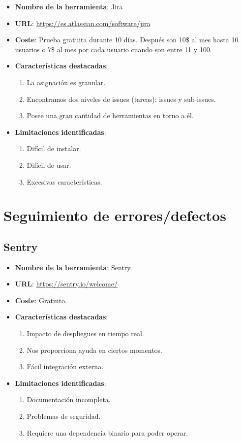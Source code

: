 \begin{itemize}
	\item \textbf{Nombre de la herramienta}: Jira
	\item \textbf{URL}: \url{https://es.atlassian.com/software/jira}
	\item \textbf{Coste}: Prueba gratuita durante 10 días. Después son 10\$ al mes hasta 10 usuarios o 7\$ al mes por cada usuario cuando son entre 11 y 100. 
	\item \textbf{Características destacadas}:
	\begin{enumerate}
		\item La asignación es granular.
		\item Encontramos dos niveles de issues (tareas): issues y sub-issues.
		\item Posee una gran cantidad de herramientas en torno a él.
	\end{enumerate}
	\item \textbf{Limitaciones identificadas}:
	\begin{enumerate}
		\item Difícil de instalar.
		\item Difícil de usar.
		\item Excesivas características.
	\end{enumerate}
\end{itemize}

\section{Seguimiento de errores/defectos}	 

\subsection{Sentry}

\begin{itemize}
	\item \textbf{Nombre de la herramienta}: Sentry
	\item \textbf{URL}: \url{https://sentry.io/welcome/}
	\item \textbf{Coste}: Gratuito.
	\item \textbf{Características destacadas}:
	\begin{enumerate}
		\item Impacto de despliegues en tiempo real.
		\item Nos proporciona ayuda en ciertos momentos.
		\item Fácil integración externa.
	\end{enumerate}
	\item \textbf{Limitaciones identificadas}:
	\begin{enumerate}
		\item Documentación incompleta.
		\item Problemas de seguridad.
		\item Requiere una dependencia binario para poder operar.
	\end{enumerate}
\end{itemize}


